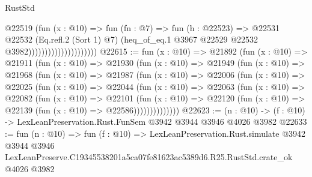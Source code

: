 \begin{lexlean}{RustStd}
\begin{coremodule}
                                        @22519
                                          (fun (x : @10) =>
                                          fun (fn : @7) =>
                                          fun (h : @22523) =>
                                          @22531
                                            @22532
                                            (Eq.refl.{2} (Sort 1) @7)
                                            (heq_of_eq.{1}
                                              @3967
                                              @22529
                                              @22532
                                              @3982)))))))))))))))))))))
@22615 := fun (x : @10) =>
  @21892
    (fun (x : @10) =>
    @21911
      (fun (x : @10) =>
      @21930
        (fun (x : @10) =>
        @21949
          (fun (x : @10) =>
          @21968
            (fun (x : @10) =>
            @21987
              (fun (x : @10) =>
              @22006
                (fun (x : @10) =>
                @22025
                  (fun (x : @10) =>
                  @22044
                    (fun (x : @10) =>
                    @22063
                      (fun (x : @10) =>
                      @22082
                        (fun (x : @10) =>
                        @22101
                          (fun (x : @10) =>
                          @22120 (fun (x : @10) => @22139 (fun (x : @10) => @22586))))))))))))))
@22623 := (n : @10) -> (f : @10) -> LexLeanPreservation.Rust.FunSem @3942 @3944 @3946 @4026 @3982
@22633 := fun (n : @10) =>
  fun (f : @10) =>
  LexLeanPreservation.Rust.simulate
    @3942
    @3944
    @3946
    LexLeanPreserve.C19345538201a5ca07fe81623ac5389d6.R25.RustStd.crate_ok
    @4026
    @3982
\end{coremodule}
\end{lexlean}
